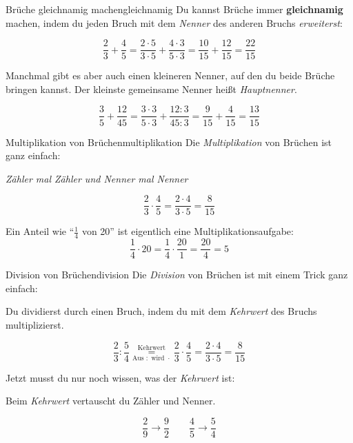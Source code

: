 \documentclass[12pt,a5paper,landscape]{scrartcl}
\begin{document}
	\begin{hilfekarte}{Brüche gleichnamig machen}{gleichnamig}
		Du kannst Brüche immer \textbf{gleichnamig} machen, indem du jeden Bruch mit dem \emph{Nenner} des anderen Bruchs \emph{erweiterst}:
		
		\[ \frac{2}{3} + \frac{4}{5} = \frac{2\cdot 5}{3\cdot 5} + \frac{4\cdot 3}{5\cdot 3} = \frac{10}{15} + \frac{12}{15} = \frac{22}{15} \]
		
		\vspace{2cm}
		Manchmal gibt es aber auch einen kleineren Nenner, auf den du beide Brüche bringen kannst. Der kleinste gemeinsame Nenner heißt \emph{Hauptnenner}.
		
		\[ \frac{3}{5} + \frac{12}{45} = \frac{3\cdot 3}{5\cdot 3} + \frac{12 : 3}{45 : 3} = \frac{9}{15} + \frac{4}{15} = \frac{13}{15} \]
	\end{hilfekarte}
	
	\begin{hilfekarte}{Multiplikation von Brüchen}{multiplikation}
		Die \emph{Multiplikation} von Brüchen ist ganz einfach:
		
		\begin{center}\itshape
			Zähler mal Zähler und Nenner mal Nenner
		\end{center}
		\[ \frac{2}{3}\cdot \frac{4}{5} = \frac{2\cdot 4}{3\cdot 5} = \frac{8}{15} \]
		
		\vspace{1cm}
		Ein Anteil wie \enquote{$\tfrac{1}{4}$ von 20} ist eigentlich eine Multiplikationsaufgabe:
		\[ \frac{1}{4}\cdot 20 = \frac{1}{4}\cdot \frac{20}{1} = \frac{20}{4} = 5 \]
	\end{hilfekarte}
	
	\begin{hilfekarte}{Division von Brüchen}{division}
		Die \emph{Division} von Brüchen ist mit einem Trick ganz einfach:
		
		\begin{center}
			Du dividierst durch einen Bruch, indem du mit dem \emph{Kehrwert} des Bruchs multiplizierst.
		\end{center}
		\[ \frac{2}{3}: \frac{5}{4} \overset{\text{Kehrwert}}{\underset{\text{Aus }:
		\text{ wird }\cdot}{=}} \frac{2}{3}\cdot  \frac{4}{5} = \frac{2\cdot 4}{3\cdot 5} = \frac{8}{15} \]
		
		\vspace{1cm}
		Jetzt musst du nur noch wissen, was der \emph{Kehrwert} ist:
		\begin{center}
			Beim \emph{Kehrwert} vertauscht du Zähler und Nenner.
		\end{center}
		\[ \frac{2}{9} \rightarrow \frac{9}{2} \qquad \frac{4}{5} \rightarrow \frac{5}{4}\]
	\end{hilfekarte}
		
\end{document}
